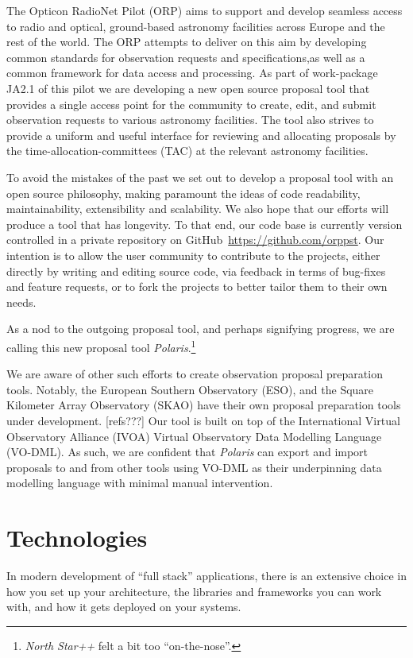\documentclass[11pt,twoside]{article}
\begin{document}
The Opticon RadioNet Pilot (ORP) aims to support and develop seamless access to radio and optical,
ground-based astronomy facilities across Europe and the rest of the world.
The ORP attempts to deliver on this aim by developing common standards for observation requests and
specifications,as well as a common framework for data access and processing.
As part of work-package JA2.1 of this pilot we are developing a new open source proposal tool that provides
a single access point for the community to create, edit, and submit observation requests to various astronomy
facilities.
The tool also strives to provide a uniform and useful interface for reviewing and allocating proposals by the
time-allocation-committees (TAC) at the relevant astronomy facilities.

To avoid the mistakes of the past we set out to develop a proposal tool with an open source philosophy, making
paramount the ideas of code readability, maintainability, extensibility and scalability.
We also hope that our efforts will produce a tool that has longevity.
To that end, our code base is currently version controlled in a private repository on
GitHub~\url{https://github.com/orppst}.
Our intention is to allow the user community to contribute to the projects, either directly by writing and
editing source code, via feedback in terms of bug-fixes and feature requests, or to fork the projects to
better tailor them to their own needs.

As a nod to the outgoing proposal tool, and perhaps signifying progress, we are calling this new proposal tool
\emph{Polaris}.\footnote{\emph{North Star++} felt a bit too ``on-the-nose''.}

We are aware of other such efforts to create observation proposal preparation tools.
Notably, the European Southern Observatory (ESO), and the Square Kilometer Array Observatory (SKAO) have
their own proposal preparation tools under development. [refs???]
Our tool is built on top of the International Virtual Observatory Alliance (IVOA) Virtual
Observatory Data Modelling Language (VO-DML).
As such, we are confident that \emph{Polaris} can export and import proposals to and from other tools using
VO-DML as their underpinning data modelling language with minimal manual intervention.


\section{Technologies}\label{sec:technologies}

In modern development of ``full stack'' applications, there is an extensive choice in how you set up your
architecture, the libraries and frameworks you can work with, and how it gets deployed on your systems.
\end{document}
